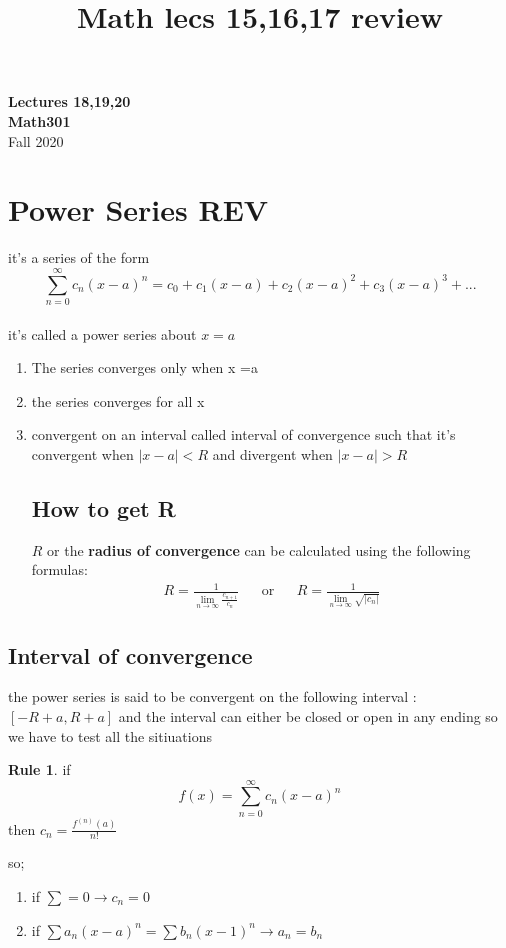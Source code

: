 \documentclass[11pt]{article}
\theoremstyle{definition}
\newtheorem{reg}{Rule}
\begin{document}
\setcounter{section}{0}
\title{Math lecs 15,16,17 review}

\thispagestyle{empty}
\tableofcontents
\begin{center}
{\LARGE \bf Lectures 18,19,20}\\
{\large \bf Math301}\\
Fall 2020
\end{center}

\section{Power Series REV}
it's a series of the form \\
\[ \sum_{n=0}^{\infty} c_n(x-a)^n = c_0 + c_1(x-a) + c_2(x-a)^2 + c_3(x-a)^3 + ...  \]
\\
it's called a power series about $x=a$
\begin{enumerate}

\item The series converges only when x =a 
\item the series converges for all x
\item convergent on an interval called interval of convergence such that it's convergent when  $ |x-a| < R $ and divergent when $|x-a|>R$

\subsection{How to get R}
$R$ or the \textbf{radius of convergence} can be calculated using the following formulas: \\
\begin{align}
	R = \frac{1}{\lim_{n \to \infty} \frac{c_{n+1}}{c_n}} && \text{or} &&  R = \frac{1}{\lim_{n \to \infty} \sqrt{|c_n|}}
\end{align}

\end{enumerate}
\subsection{Interval of convergence}
the power series is said to be convergent on the following  interval :
$ [-R+a , R+a ]  $ and the interval can either be closed or open in any ending so we have to test all the sitiuations
\begin{reg}
	if \[ f(x) =  \sum_{n=0}^{\infty} c_n(x-a)^n \] 
	then   $c_n = \frac{f^{(n)} (a)}{n!} $ 
\end{reg}
so; 
\begin{enumerate}

\item if $\sum = 0 \to c_n = 0 $ 
\item if $ \sum a_n(x-a)^n = \sum b_n(x-1)^n \to a_n = b_n $ 

\end{enumerate}
\end{document}

